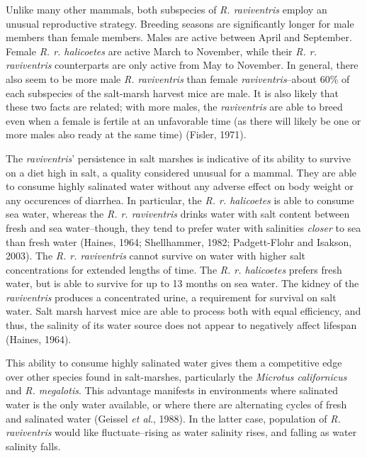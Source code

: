 \documentclass[a4paper]{article}
\begin{document}
Unlike many other mammals, both subspecies of \textit{R. raviventris} employ an unusual reproductive strategy. Breeding seasons are significantly longer for male members than female members. Males are active between April and September. Female \textit{R. r. halicoetes} are active March to November, while their \textit{R. r. raviventris} counterparts are only active from May to November. In general, there also seem to be more male \textit{R. raviventris} than female \textit{raviventris}--about 60\% of each subspecies of the salt-marsh harvest mice are male. It is also likely that these two facts are related; with more males, the \textit{raviventris} are able to breed even when a female is fertile at an unfavorable time (as there will likely be one or more males also ready at the same time) (Fisler, 1971).

The \textit{raviventris}' persistence in salt marshes is indicative of its ability to survive on a diet high in salt, a quality considered unusual for a mammal. They are able to consume highly salinated water without any adverse effect on body weight or any occurences of diarrhea. In particular, the \textit{R. r. halicoetes} is able to consume sea water, whereas the \textit{R. r. raviventris} drinks water with salt content between fresh and sea water--though, they tend to prefer water with salinities \textit{closer} to sea than fresh water (Haines, 1964; Shellhammer, 1982; Padgett-Flohr and Isakson, 2003). The \textit{R. r. raviventris} cannot survive on water with higher salt concentrations for extended lengths of time. The \textit{R. r. halicoetes} prefers fresh water, but is able to survive for up to 13 months on sea water. The kidney of the \textit{raviventris} produces a concentrated urine, a requirement for survival on salt water. Salt marsh harvest mice are able to process both with equal efficiency, and thus, the salinity of its water source does not appear to negatively affect lifespan (Haines, 1964).

This ability to consume highly salinated water gives them a competitive edge over other species found in salt-marshes, particularly the \textit{Microtus californicus} and \textit{R. megalotis}. This advantage manifests in environments where salinated water is the only water available, or where there are alternating cycles of fresh and salinated water (Geissel \textit{et al}., 1988). In the latter case, population of \textit{R. raviventris} would like fluctuate--rising as water salinity rises, and falling as water salinity falls.
\end{document}
